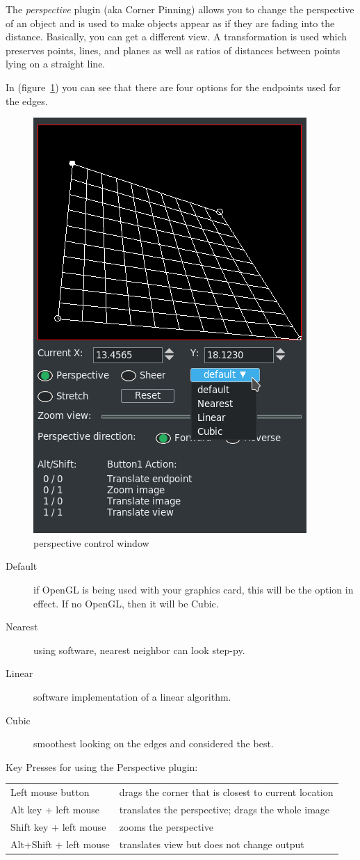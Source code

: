 The \textit{perspective} plugin (aka Corner Pinning) allows you to change the perspective of an object and is used to make objects appear as if they are fading into the distance. Basically, you can get a different view. A transformation is used which preserves points, lines, and planes as well as ratios of distances between points lying on a straight line.

In (figure~\ref{fig:perspective}) you can see that there are four options for the endpoints used for the edges.

\begin{figure}[htpb]
    \centering
    \includegraphics[width=0.5\linewidth]{images/perspective.png}
    \caption{perspective control window}
    \label{fig:perspective}
\end{figure}

\begin{description}
    \item[Default] if OpenGL is being used with your graphics card, this will be the option in effect. If no OpenGL, then it will be Cubic.
    \item[Nearest] using software, nearest neighbor can look step-py.
    \item[Linear] software implementation of a linear algorithm.
    \item[Cubic] smoothest looking on the 
    edges and considered the best.
\end{description}

Key Presses for using the Perspective plugin:

\begin{tabular}{l l}	
    \toprule
    Left mouse button & drags the corner that is closest to current location \\
    Alt key + left mouse & translates the perspective; drags the whole image \\
    Shift key + left mouse & zooms the perspective \\
    Alt+Shift + left mouse & translates view but does not change output \\
    \bottomrule
\end{tabular}

